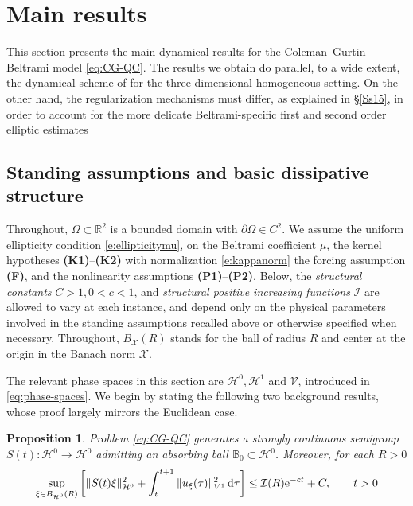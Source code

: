 \documentclass[12pt,leqno]{amsart}
\def\e{{\rm e}}
\def\d{{\rm d}}
\def\R {\mathbb{R}}
\newtheorem{proposition}[theorem]{Proposition}
\theoremstyle{definition}
\numberwithin{equation}{section}
\numberwithin{figure}{section}
\begin{document}
 




 
 
 
 
\section{Main results}\label{sec:mainres}

This section presents the main dynamical results for the 
Coleman--Gurtin-Beltrami model \eqref{eq:CG-QC}.  The results we obtain do parallel, to a wide extent, the 
dynamical scheme of \cites{CGDP2010,AMN} for the three-dimensional homogeneous setting. On the other hand, the regularization mechanisms must differ, as explained in \S\ref{Ss15},  in order to account for the more delicate Beltrami-specific first and second order
elliptic estimates    
\subsection{Standing assumptions and basic dissipative structure}\label{subsec:main-assumptions}

Throughout, $\Omega\subset\R^2$ is a bounded domain with $\partial\Omega\in C^2$.
We assume the uniform ellipticity condition \eqref{e:ellipticitymu},  on the Beltrami coefficient $\mu$,
the kernel hypotheses \textbf{(K1)}--\textbf{(K2)} with normalization \eqref{e:kappanorm}
the forcing assumption \textbf{(F)}, and the nonlinearity assumptions \textbf{(P1)}--\textbf{(P2)}. Below, the  
  \emph{structural constants} $C>1,0<c<1$, 
   and \emph{structural positive increasing functions} $\mathcal I$
 are allowed to vary at each instance, and depend only on the physical parameters involved in the standing assumptions recalled above or otherwise specified when necessary. Throughout,   $B_{\mathcal X}(R)$ stands for the ball of radius $R$ and center at the origin in the Banach norm $\mathcal X$.

The   relevant phase spaces in this section are ${\mathcal H^0}, {\mathcal H^1} $ and $\mathcal V$,   introduced in \eqref{eq:phase-spaces}. We begin by stating the following two background results, whose proof largely mirrors the Euclidean case.


\begin{proposition}
	
 \label{prop:main-H0}
  Problem \eqref{eq:CG-QC} generates a strongly continuous semigroup
$S(t):\mathcal H^{0}\to\mathcal H^{0}$ admitting  an absorbing ball
$\mathbb B_{0}\subset\mathcal H^{0}$.
Moreover, for each $R>0$    \begin{equation}
	\label{e:H0dis}
	\sup_{\xi \in B_{\mathcal H^0}(R)} \left[
\|S(t)\xi\|_{\mathcal H^0}^2+\int_t^{t+1}\|u_\xi(\tau)\|_{{V^1}}^2\,\d\tau \right]\le \mathcal I(R) \e^{-ct}+C, \qquad t>0
\end{equation}

\end{proposition}
\end{document}
